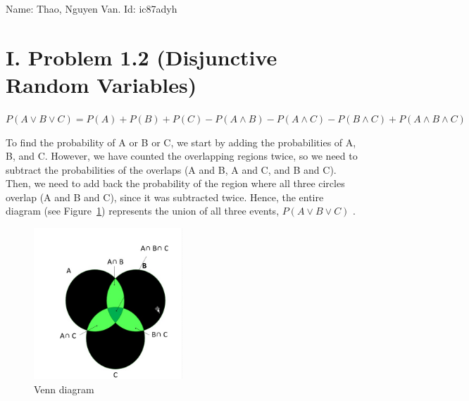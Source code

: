 \documentclass{article}
\begin{document}
Name: Thao, Nguyen Van.   Id: ic87adyh
\section*{\textbf{I. Problem 1.2 (Disjunctive Random Variables)}}

$P(A \lor B \lor C) = P(A) + P(B) + P(C) - P(A \land B) - P(A \land C) - P(B \land C) + P(A \land B \land C)$

To find the probability of A or B or C, we start by adding the probabilities of A, B, and C. However, we have counted the overlapping regions twice, so we need to subtract the probabilities of the overlaps (A and B, A and C, and B and C). Then, we need to add back the probability of the region where all three circles overlap (A and B and C), since it was subtracted twice.  Hence,   the entire diagram (see Figure~\ref{fig:ven_diagram}) represents the union of all three events,  $P(A \lor B \lor C)$   .

\begin{figure}[H]
  \centering
  \includegraphics[width=0.5\textwidth]{ven_diagram.jpeg}
  \caption{Venn diagram}
  \label{fig:ven_diagram}
\end{figure}
\end{document}
